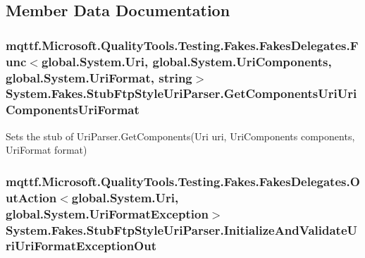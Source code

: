 \subsection{Member Data Documentation}
\hypertarget{class_system_1_1_fakes_1_1_stub_ftp_style_uri_parser_a8fe95be6800f4dc55763cc2a0880c563}{
\subsubsection[{Get\-Components\-Uri\-Uri\-Components\-Uri\-Format}]{\setlength{\rightskip}{0pt plus 5cm}mqttf.\-Microsoft.\-Quality\-Tools.\-Testing.\-Fakes.\-Fakes\-Delegates.\-Func$<$global.\-System.\-Uri, global.\-System.\-Uri\-Components, global.\-System.\-Uri\-Format, string$>$ System.\-Fakes.\-Stub\-Ftp\-Style\-Uri\-Parser.\-Get\-Components\-Uri\-Uri\-Components\-Uri\-Format}}\label{class_system_1_1_fakes_1_1_stub_ftp_style_uri_parser_a8fe95be6800f4dc55763cc2a0880c563}


Sets the stub of Uri\-Parser.\-Get\-Components(\-Uri uri, Uri\-Components components, Uri\-Format format)

\hypertarget{class_system_1_1_fakes_1_1_stub_ftp_style_uri_parser_aabaffa55785a677bec884410bf3387a6}{
\subsubsection[{Initialize\-And\-Validate\-Uri\-Uri\-Format\-Exception\-Out}]{\setlength{\rightskip}{0pt plus 5cm}mqttf.\-Microsoft.\-Quality\-Tools.\-Testing.\-Fakes.\-Fakes\-Delegates.\-Out\-Action$<$global.\-System.\-Uri, global.\-System.\-Uri\-Format\-Exception$>$ System.\-Fakes.\-Stub\-Ftp\-Style\-Uri\-Parser.\-Initialize\-And\-Validate\-Uri\-Uri\-Format\-Exception\-Out}}\label{class_system_1_1_fakes_1_1_stub_ftp_style_uri_parser_aabaffa55785a677bec884410bf3387a6}



